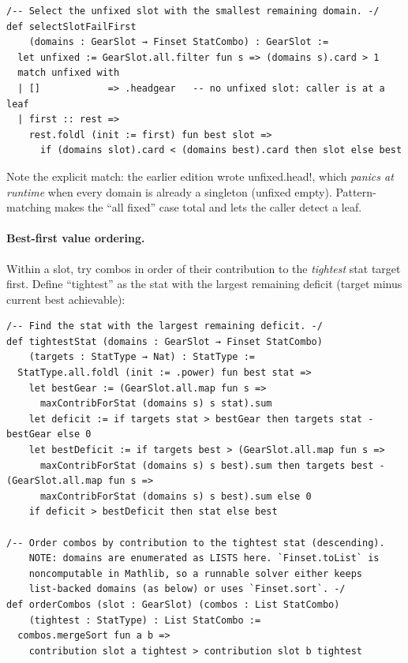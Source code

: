 \documentclass[11pt, a4paper, oneside]{book}
\newcommand{\li}[1]{{\ttfamily\small\color{deepblue}#1}}
\begin{document}
\begin{leanbox}[title={Lean 4 (Mathlib) --- Fail-First Variable Selection}]
\begin{verbatim}
/-- Select the unfixed slot with the smallest remaining domain. -/
def selectSlotFailFirst
    (domains : GearSlot → Finset StatCombo) : GearSlot :=
  let unfixed := GearSlot.all.filter fun s => (domains s).card > 1
  match unfixed with
  | []            => .headgear   -- no unfixed slot: caller is at a leaf
  | first :: rest =>
    rest.foldl (init := first) fun best slot =>
      if (domains slot).card < (domains best).card then slot else best
\end{verbatim}
\end{leanbox}

Note the explicit \li{match}: the earlier edition wrote \li{unfixed.head!},
which \emph{panics at runtime} when every domain is already a singleton
(\li{unfixed} empty).  Pattern-matching makes the ``all fixed'' case total and
lets the caller detect a leaf.

\paragraph{Best-first value ordering.}
Within a slot, try combos in order of their contribution to the
\emph{tightest} stat target first.  Define ``tightest'' as the stat with
the largest remaining deficit (target minus current best achievable):

\begin{leanbox}[title={Lean 4 (Mathlib) --- Value Ordering by Tightest Deficit}]
\begin{verbatim}
/-- Find the stat with the largest remaining deficit. -/
def tightestStat (domains : GearSlot → Finset StatCombo)
    (targets : StatType → Nat) : StatType :=
  StatType.all.foldl (init := .power) fun best stat =>
    let bestGear := (GearSlot.all.map fun s =>
      maxContribForStat (domains s) s stat).sum
    let deficit := if targets stat > bestGear then targets stat - bestGear else 0
    let bestDeficit := if targets best > (GearSlot.all.map fun s =>
      maxContribForStat (domains s) s best).sum then targets best - (GearSlot.all.map fun s =>
      maxContribForStat (domains s) s best).sum else 0
    if deficit > bestDeficit then stat else best

/-- Order combos by contribution to the tightest stat (descending).
    NOTE: domains are enumerated as LISTS here. `Finset.toList` is
    noncomputable in Mathlib, so a runnable solver either keeps
    list-backed domains (as below) or uses `Finset.sort`. -/
def orderCombos (slot : GearSlot) (combos : List StatCombo)
    (tightest : StatType) : List StatCombo :=
  combos.mergeSort fun a b =>
    contribution slot a tightest > contribution slot b tightest
\end{verbatim}
\end{leanbox}
\end{document}
